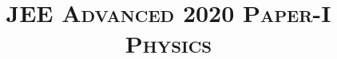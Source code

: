 \documentclass{article}
\title{\textsc{JEE Advanced 2020 Paper-I\\Physics}}
\date{}
\begin{document}
\maketitle
\begin{enumerate}
    
    
\end{enumerate}
\end{document}
